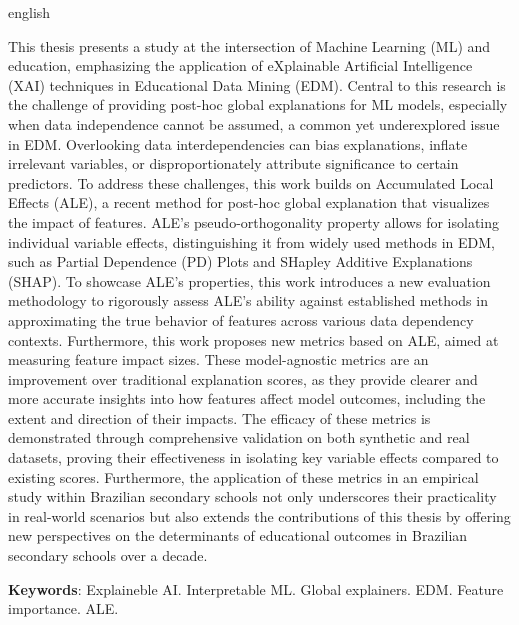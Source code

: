 \begin{resumo}[Abstract]
\begin{otherlanguage*}{english}

This thesis presents a study at the intersection of Machine Learning (ML) and education, emphasizing the application of eXplainable Artificial Intelligence (XAI) techniques in Educational Data Mining (EDM). Central to this research is the challenge of providing post-hoc global explanations for ML models, especially when data independence cannot be assumed, a common yet underexplored issue in EDM. Overlooking data interdependencies can bias explanations, inflate irrelevant variables, or disproportionately attribute significance to certain predictors. To address these challenges, this work builds on Accumulated Local Effects (ALE), a recent method for post-hoc global explanation that visualizes the impact of features. ALE's pseudo-orthogonality property allows for isolating individual variable effects, distinguishing it from widely used methods in EDM, such as Partial Dependence (PD) Plots and SHapley Additive Explanations (SHAP). To showcase ALE's properties, this work introduces a new evaluation methodology to rigorously assess ALE's ability against established methods in approximating the true behavior of features across various data dependency contexts. Furthermore, this work proposes new metrics based on ALE, aimed at measuring feature impact sizes. These model-agnostic metrics are an improvement over traditional explanation scores, as they provide clearer and more accurate insights into how features affect model outcomes, including the extent and direction of their impacts. The efficacy of these metrics is demonstrated through comprehensive validation on both synthetic and real datasets, proving their effectiveness in isolating key variable effects compared to existing scores. Furthermore, the application of these metrics in an empirical study within Brazilian secondary schools not only underscores their practicality in real-world scenarios but also extends the contributions of this thesis by offering new perspectives on the determinants of educational outcomes in Brazilian secondary schools over a decade.

\vspace{\onelineskip} 

\noindent 
\textbf{Keywords}: Explaineble AI. Interpretable ML.  Global explainers. EDM. Feature importance. ALE.
\end{otherlanguage*}
\end{resumo}
